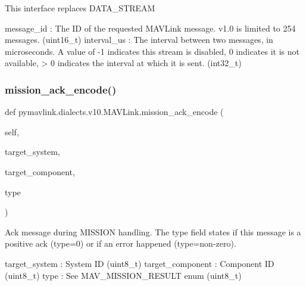 \begin{DoxyVerb}
\begin{DoxyVerb}
\begin{DoxyVerb}
\begin{DoxyVerb}
\begin{DoxyVerb}This interface replaces DATA_STREAM

message_id                : The ID of the requested MAVLink message. v1.0 is limited to 254 messages. (uint16_t)
interval_us               : The interval between two messages, in microseconds. A value of -1 indicates this stream is disabled, 0 indicates it is not available, > 0 indicates the interval at which it is sent. (int32_t)\end{DoxyVerb}
 \mbox{\label{classpymavlink_1_1dialects_1_1v10_1_1MAVLink_a398accca2114b19f54f2b9fb7be54774}} 
\subsubsection{\texorpdfstring{mission\+\_\+ack\+\_\+encode()}{mission\_ack\_encode()}}
{\footnotesize\ttfamily def pymavlink.\+dialects.\+v10.\+M\+A\+V\+Link.\+mission\+\_\+ack\+\_\+encode (\begin{DoxyParamCaption}\item[{}]{self,  }\item[{}]{target\+\_\+system,  }\item[{}]{target\+\_\+component,  }\item[{}]{type }\end{DoxyParamCaption})}

\begin{DoxyVerb}Ack message during MISSION handling. The type field states if this
message is a positive ack (type=0) or if an error
happened (type=non-zero).

target_system             : System ID (uint8_t)
target_component          : Component ID (uint8_t)
type                      : See MAV_MISSION_RESULT enum (uint8_t)\end{DoxyVerb}
 \mbox{\label{classpymavlink_1_1dialects_1_1v10_1_1MAVLink_a18ee07bc83531c8c1eb8eb702790ec13}} 

\end{DoxyVerb}
\end{DoxyVerb}
\end{DoxyVerb}
\end{DoxyVerb}
